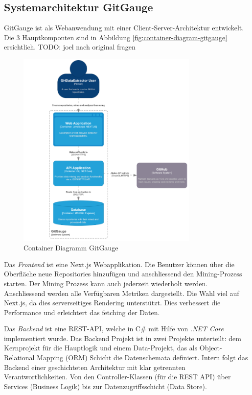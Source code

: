 \subsection{Systemarchitektur GitGauge}
GitGauge ist als Webanwendung mit einer Client-Server-Architektur entwickelt. Die 3 Hauptkomponten sind in Abbildung \autoref{fig:container-diagram-gitgauge} ersichtlich. 
TODO: joel nach original fragen
\begin{figure}[htbp]
    \centering
    \includegraphics[width=0.8\textwidth]{Figures/container-diagram-gitgauge.png}
    \caption{Container Diagramm GitGauge \parencite{grand_joel_vt1_joelgrand_repository_2024}}
    \label{fig:container-diagram-gitgauge}
\end{figure}

Das \textit{Frontend} ist eine Next.js Webapplikation. Die Benutzer können über die Oberfläche neue Repositories hinzufügen und anschliessend den Mining-Prozess starten. Der Mining Prozess kann auch jederzeit wiederholt werden. Anschliessend werden alle Verfügbaren Metriken dargestellt. Die Wahl viel auf Next.js, da dies serverseitiges Rendering unterstützt. Dies verbessert die Performance und erleichtert das fetching der Daten. \parencite{grand_joel_vt1_joelgrand_repository_2024}

Das \textit{Backend} ist eine REST-API, welche in C\# mit Hilfe von \textit{.NET Core} implementiert wurde. Das Backend Projekt ist in zwei Projekte unterteilt: dem Kernprojekt für die Hauptlogik und einem Data-Projekt, das als Object-Relational Mapping (ORM) Schicht die Datenschemata definiert. Intern folgt das Backend einer geschichteten Architektur mit klar getrennten Verantwortlichkeiten. Von den Controller-Klassen (für die REST API) über Services (Business Logik) bis zur Datenzugriffsschicht (Data Store). \parencite{grand_joel_vt1_joelgrand_repository_2024}

